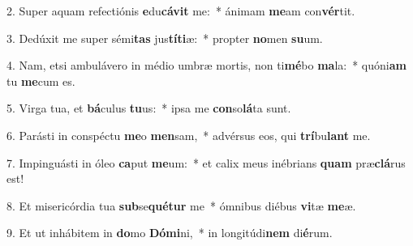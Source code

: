 2. Super aquam refectiónis \textbf{e}du\textbf{cá}\textbf{vit} me:~*  ánimam \textbf{me}am con\textbf{vér}tit.\

3. Dedúxit me super sémi\textbf{tas} jus\textbf{tí}\textbf{ti}æ:~*  propter \textbf{no}men \textbf{su}um.\

4. Nam, etsi ambulávero in médio umbræ mortis, non ti\textbf{mé}bo \textbf{ma}la:~*  quóni\textbf{am} tu \textbf{me}cum es.\

5. Virga tua, et \textbf{bá}culus \textbf{tu}us:~*  ipsa me \textbf{con}so\textbf{lá}ta sunt.\

6. Parásti in conspéctu \textbf{me}o \textbf{men}sam,~*  advérsus eos, qui \textbf{trí}bu\textbf{lant} me.\

7. Impinguásti in óleo \textbf{ca}put \textbf{me}um:~*  et calix meus inébrians \textbf{quam} præ\textbf{clá}rus est!\

8. Et misericórdia tua \textbf{sub}se\textbf{qué}\textbf{tur} me~*  ómnibus diébus \textbf{vi}tæ \textbf{me}æ.\

9. Et ut inhábitem in \textbf{do}mo \textbf{Dó}\textbf{mi}ni,~*  in longitúdi\textbf{nem} di\textbf{é}rum.\

